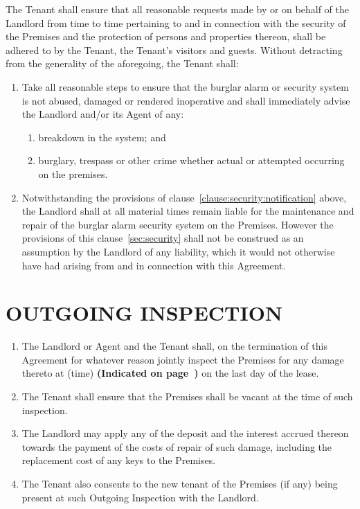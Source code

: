 \documentclass[11pt]{article}
\begin{document}
The Tenant shall ensure that all reasonable requests made by or on behalf of the Landlord from time to time pertaining to and in connection with the security of the Premises and the protection of persons and properties thereon, shall be adhered to by the Tenant, the Tenant's visitors and guests. Without detracting from the generality of the aforegoing, the Tenant shall:
\begin{enumerate}
	\item Take all reasonable steps to ensure that the burglar alarm or security system is not abused, damaged or rendered inoperative and shall immediately advise the Landlord and/or its Agent of any: \label{clause:security:notification}
		\begin{enumerate}
			\item breakdown in the system; and
			\item burglary, trespass or other crime whether actual or attempted occurring on the premises.
		\end{enumerate}
	\item Notwithstanding the provisions of clause~\ref{clause:security:notification} above, the Landlord shall at all material times remain liable for the maintenance and repair of the burglar alarm security system on the Premises. However the provisions of this clause~\ref{sec:security} shall not be construed as an assumption by the Landlord of any liability, which it would not otherwise have had arising from and in connection with this Agreement.
\end{enumerate}

\section{\uppercase{outgoing inspection}}
\label{sec:outgoing-inspection}

\begin{enumerate}
	\item The Landlord or Agent and the Tenant shall, on the termination of this Agreement for whatever reason jointly inspect the Premises for any damage thereto at \underline{\hspace{3em}} (time) \textbf{(Indicated on page~\pageref{input:termination-date})} on the last day of the lease.
	\item The Tenant shall ensure that the Premises shall be vacant at the time of such inspection. \label{clause:outgoing-inspection:vancant}
	\item The Landlord may apply any of the deposit and the interest accrued thereon towards the payment of the costs of repair of such damage, including the replacement cost of any keys to the Premises. \label{clause:outgoing-inspection:deposit}
	\item The Tenant also consents to the new tenant of the Premises (if any) being present at such Outgoing Inspection with the Landlord.
\end{enumerate}
\end{document}
